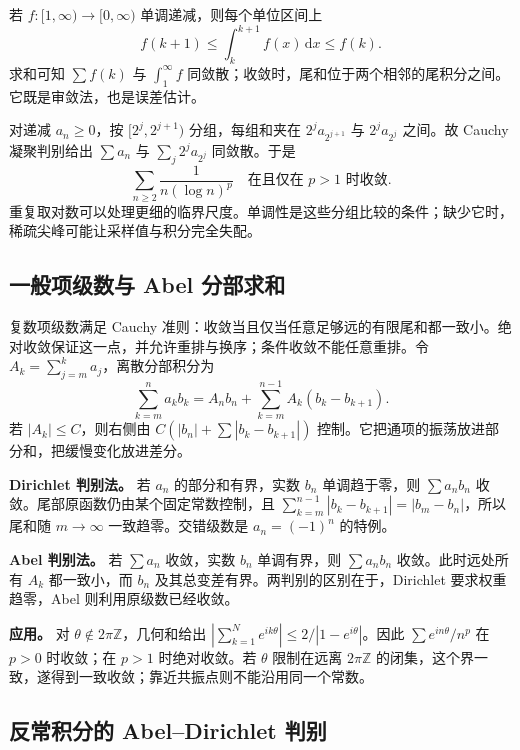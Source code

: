 \documentclass[12pt,fontset=fandol]{ctexart}
\begin{document}
\label{app:series-integral}

若 $f:[1,\infty)\to[0,\infty)$ 单调递减，则每个单位区间上
\[
f(k+1)\leq\int_k^{k+1}f(x)\,\mathrm dx\leq f(k).
\]
求和可知 $\sum f(k)$ 与 $\int_1^\infty f$ 同敛散；收敛时，尾和位于两个相邻的尾积分之间。它既是审敛法，也是误差估计。

对递减 $a_n\geq0$，按 $[2^j,2^{j+1})$ 分组，每组和夹在 $2^ja_{2^{j+1}}$ 与 $2^ja_{2^j}$ 之间。故 Cauchy 凝聚判别给出 $\sum a_n$ 与 $\sum_j2^ja_{2^j}$ 同敛散。于是
\[
\sum_{n\geq2}\frac1{n(\log n)^p}
\quad\text{在且仅在 }p>1\text{ 时收敛}.
\]
重复取对数可以处理更细的临界尺度。单调性是这些分组比较的条件；缺少它时，稀疏尖峰可能让采样值与积分完全失配。

\subsection{一般项级数与 Abel 分部求和}

\label{app:series-dirichlet}

复数项级数满足 Cauchy 准则：收敛当且仅当任意足够远的有限尾和都一致小。绝对收敛保证这一点，并允许重排与换序；条件收敛不能任意重排。令 $A_k=\sum_{j=m}^ka_j$，离散分部积分为
\[
\sum_{k=m}^na_kb_k=A_nb_n+\sum_{k=m}^{n-1}A_k(b_k-b_{k+1}).
\]
若 $|A_k|\leq C$，则右侧由 $C(|b_n|+\sum|b_k-b_{k+1}|)$ 控制。它把通项的振荡放进部分和，把缓慢变化放进差分。

\textbf{Dirichlet 判别法。} 若 $a_n$ 的部分和有界，实数 $b_n$ 单调趋于零，则 $\sum a_nb_n$ 收敛。尾部原函数仍由某个固定常数控制，且 $\sum_{k=m}^{n-1}|b_k-b_{k+1}|=|b_m-b_n|$，所以尾和随 $m\to\infty$ 一致趋零。交错级数是 $a_n=(-1)^n$ 的特例。

\textbf{Abel 判别法。} 若 $\sum a_n$ 收敛，实数 $b_n$ 单调有界，则 $\sum a_nb_n$ 收敛。此时远处所有 $A_k$ 都一致小，而 $b_n$ 及其总变差有界。两判别的区别在于，Dirichlet 要求权重趋零，Abel 则利用原级数已经收敛。

\textbf{应用。} 对 $\theta\notin2\pi\mathbb Z$，几何和给出 $|\sum_{k=1}^Ne^{ik\theta}|\leq2/|1-e^{i\theta}|$。因此 $\sum e^{in\theta}/n^p$ 在 $p>0$ 时收敛；在 $p>1$ 时绝对收敛。若 $\theta$ 限制在远离 $2\pi\mathbb Z$ 的闭集，这个界一致，遂得到一致收敛；靠近共振点则不能沿用同一个常数。

\subsection{反常积分的 Abel–Dirichlet 判别}

\label{app:series-ad-integral}
\end{document}
